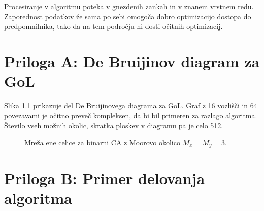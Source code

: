 \documentclass[12pt,a4paper,openany,twoside]{book}
\begin{document}
Procesiranje v algoritmu poteka v gnezdenih zankah in v znanem vrstnem redu.
Zaporednost podatkov že sama po sebi omogoča dobro optimizacijo dostopa do predpomnilnika,
tako da na tem področju ni dosti očitnih optimizacij.


\chapter{Priloga A: De Bruijinov diagram za GoL}

Slika \ref{network_single_moore} prikazuje del De Bruijinovega diagrama za GoL.
Graf z 16 vozlišči in 64 povezavami je očitno preveč kompleksen, da bi bil primeren za razlago algoritma.
Število vseh možnih okolic, skratka ploskev v diagramu pa je celo 512.

\begin{figure}[htb]
\centerline{}
\caption[Mreža ene celice za GoL.]{Mreža ene celice za binarni CA z Moorovo okolico \(M_x=M_y=3\).}
\label{network_single_moore}
\end{figure}

\chapter{Priloga B: Primer delovanja algoritma}


\newpage


\appendix


\newpage
{}
\listoffigures




\newpage


%
\label{stran_literatura}
 

\end{document}
